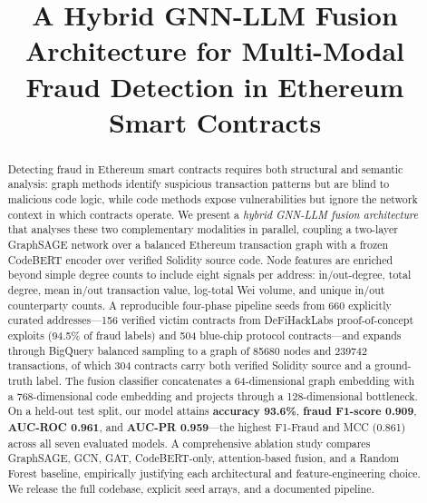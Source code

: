 \documentclass[conference]{IEEEtran}
\begin{document}
\title{A Hybrid GNN-LLM Fusion Architecture for Multi-Modal Fraud Detection in Ethereum Smart Contracts}

\author{
}

\maketitle

\begin{abstract}
Detecting fraud in Ethereum smart contracts requires both structural and
semantic analysis: graph methods identify suspicious transaction patterns
but are blind to malicious code logic, while code methods expose
vulnerabilities but ignore the network context in which contracts
operate.  We present a \emph{hybrid GNN-LLM fusion architecture} that
analyses these two complementary modalities in parallel, coupling a
two-layer GraphSAGE network over a balanced Ethereum transaction graph
with a frozen CodeBERT encoder over verified Solidity source code.  Node
features are enriched beyond simple degree counts to include eight
signals per address: in/out-degree, total degree, mean in/out transaction
value, log-total Wei volume, and unique in/out counterparty counts.  A
reproducible four-phase pipeline seeds from 660 explicitly curated
addresses---156 verified victim contracts from DeFiHackLabs
proof-of-concept exploits (94.5\% of fraud labels) and 504 blue-chip
protocol contracts---and expands through BigQuery balanced sampling to
a graph of \num{85680} nodes and \num{239742} transactions, of which
\num{304} contracts carry both verified Solidity source and a
ground-truth label.  The fusion classifier concatenates a 64-dimensional
graph embedding with a 768-dimensional code embedding and projects
through a 128-dimensional bottleneck.  On a held-out test split, our
model attains \textbf{accuracy 93.6\%}, \textbf{fraud F1-score 0.909},
\textbf{AUC-ROC 0.961}, and \textbf{AUC-PR 0.959}---the highest
F1-Fraud and MCC (0.861) across all seven evaluated models.  A
comprehensive ablation study compares GraphSAGE, GCN, GAT, CodeBERT-only,
attention-based fusion, and a Random Forest baseline, empirically
justifying each architectural and feature-engineering choice.  We release
the full codebase, explicit seed arrays, and a documented pipeline.
\end{abstract}
\end{document}
